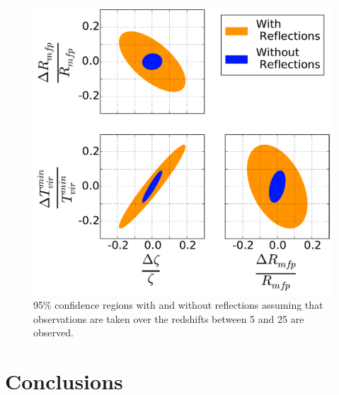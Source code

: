 \documentclass[twocolumn]{emulateapj}
\begin{document}
\begin{figure}[h!]
\includegraphics[width=.5\textwidth]{figures/reionization_triangle_compare_v1.pdf}
\caption{95\% confidence regions with and without reflections assuming that observations are taken over the redshifts between 5 and 25 are observed.}
\end{figure}


\section{Conclusions}
\label{sec:Conclusion}



\appendix
\end{document}
